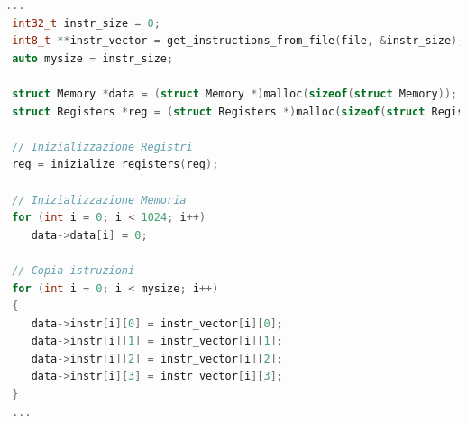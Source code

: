 \begin{lstlisting}[language=C++]
...
 int32_t instr_size = 0;
 int8_t **instr_vector = get_instructions_from_file(file, &instr_size);
 auto mysize = instr_size;

 struct Memory *data = (struct Memory *)malloc(sizeof(struct Memory));
 struct Registers *reg = (struct Registers *)malloc(sizeof(struct Registers));

 // Inizializzazione Registri
 reg = inizialize_registers(reg);

 // Inizializzazione Memoria
 for (int i = 0; i < 1024; i++)
    data->data[i] = 0;

 // Copia istruzioni
 for (int i = 0; i < mysize; i++)
 {
    data->instr[i][0] = instr_vector[i][0];
    data->instr[i][1] = instr_vector[i][1];
    data->instr[i][2] = instr_vector[i][2];
    data->instr[i][3] = instr_vector[i][3];
 }
 ...
\end{lstlisting}

\vspace{0.3cm}

